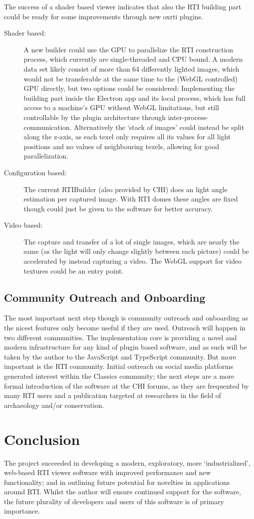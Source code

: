 The success of a shader based viewer indicates that also the RTI building part
could be ready for some improvements through new oxrti plugins.
\begin{description}
\item[Shader based:] A new builder could use the GPU to parallelize the RTI
  construction process, which currently are single-threaded and CPU bound. A
  modern data set likely consist of more than 64 differently lighted images,
  which would not be transferable at the same time to the (WebGL controlled) GPU directly, but
  two options could be considered: Implementing the building part inside the
  Electron app and its local process, which has full access to a machine's GPU
  without WebGL limitations, but still controllable by the plugin architecture
  through inter-process-communication. Alternatively the `stack of images'
  could instead be split along the z-axis, as each texel only requires all its
  values for all light positions and no values of neighbouring texels, allowing
  for good parallelization.
\item[Configuration based:] The current RTIBuilder (also provided by
  CHI\cite*{noauthor_cultural_nodate-4}) does an light angle estimation per
  captured image. With RTI domes these angles are fixed though could just be
  given to the software for better accuracy.
\item[Video based:] The capture and transfer of a lot of single images, which
  are nearly the same (as the light will only change slightly between each
  picture) could be accelerated by instead capturing a video. The WebGL support
  for video textures could be an entry point.
\end{description}

\subsection{Community Outreach and Onboarding}
The most important next step though is community outreach and onboarding as the
nicest features only become useful if they are used. Outreach will happen in two
different communities. The implementation core is providing a novel and modern
infrastructure for any kind of plugin based software, and as such will be taken
by the author to the JavaScript and TypeScript community. But more important is
the RTI community. Initial outreach on social media platforms generated interest
within the Classics community; the next steps are a more formal introduction of
the software at the CHI forums\cite*{noauthor_chiforums:_nodate}, as they are
frequented by many RTI users and a publication targeted at researchers in the
field of archaeology and/or conservation.

\section{Conclusion}
The project succeeded in developing a modern, exploratory, more `industrialized', web-based
RTI viewer software with improved performance and new functionality; and in
outlining future potential for novelties in applications around RTI\@. Whilst
the author will ensure continued support for the software, the future
plurality of developers and users of this software is of primary importance.